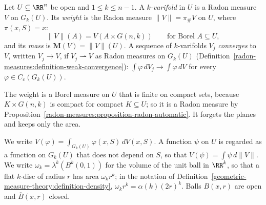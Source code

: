 \begin{definition}\label{currents:definition-varifold}
Let $U \subseteq \RR^n$ be open and $1 \leq k \leq n - 1$. A \emph{$k$-varifold} in $U$ is a Radon measure $V$ on $G_k(U)$. Its \emph{weight} is the Radon measure $\|V\| = \pi_\#V$ on $U$, where
$\pi(x, S) = x$:
\[
\|V\|(A) = V(A \times G(n, k)) \qquad \text{for Borel } A \subseteq U,
\]
and its \emph{mass} is $\mathbf{M}(V) = \|V\|(U)$. A sequence of $k$-varifolds $V_j$ \emph{converges} to $V$, written $V_j \to V$, if $V_j \rightharpoonup V$ as Radon measures on $G_k(U)$
(Definition~\ref{radon-measures:definition-weak-convergence}): $\int\varphi\,dV_j \to \int\varphi\,dV$ for every $\varphi \in C_c(G_k(U))$.
\end{definition}

The weight is a Borel measure on $U$ that is finite on compact sets, because $K \times G(n, k)$ is compact for compact $K \subseteq U$; so it is a Radon measure by
Proposition~\ref{radon-measures:proposition-radon-automatic}. It forgets the planes and keeps only the area.

\begin{notation}\label{currents:notation-varifolds}
We write $V(\varphi) = \int_{G_k(U)}\varphi(x, S)\,dV(x, S)$. A function $\psi$ on $U$ is regarded as a function on $G_k(U)$ that does not depend on $S$, so that $V(\psi) = \int\psi\,d\|V\|$. We write
$\omega_k = \lambda^k(B^k(0, 1))$ for the volume of the unit ball in $\RR^k$, so that a flat $k$-disc of radius $r$ has area $\omega_kr^k$; in the notation of
Definition~\ref{geometric-measure-theory:definition-density}, $\omega_kr^k = \alpha(k)(2r)^k$. Balls $B(x, r)$ are open and $\overline{B}(x, r)$ closed.
\end{notation}

